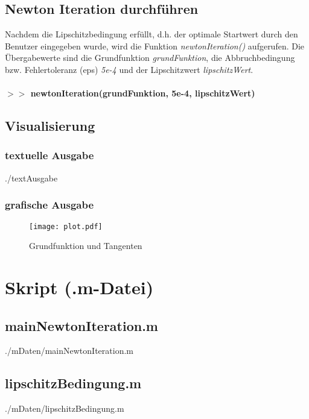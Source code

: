 \documentclass[a4paper]{scrartcl}
\begin{document}
	\subsection{Newton Iteration durchführen}
		Nachdem die Lipschitzbedingung erfüllt, d.h. der optimale Startwert durch den Benutzer eingegeben wurde, wird die Funktion \textit{newtonIteration()} aufgerufen. 
		Die Übergabewerte sind die  Grundfunktion \textit{grundFunktion}, die Abbruchbedingung bzw. Fehlertoleranz (eps) \textit{5e-4} und der Lipschitzwert \textit{lipschitzWert}. \\ \\
		\textbf{$>>$ newtonIteration(grundFunktion, 5e-4, lipschitzWert)}
		
	\subsection{Visualisierung}
	
	\subsubsection{textuelle Ausgabe}
		\lstset{language=}
			
			{./textAusgabe}
			
	\subsubsection{grafische Ausgabe}
		\begin{figure}[ht]
			\centering
			\texttt{[image: plot.pdf]}
		\caption{Grundfunktion und Tangenten}
		\end{figure}
	
	\section{Skript (.m-Datei)}
		\subsection{mainNewtonIteration.m}
			\lstset{language=}
			
			{./mDaten/mainNewtonIteration.m}
			
		\subsection{lipschitzBedingung.m}
			\lstset{language=}
			
			{./mDaten/lipschitzBedingung.m}
			
\end{document}
